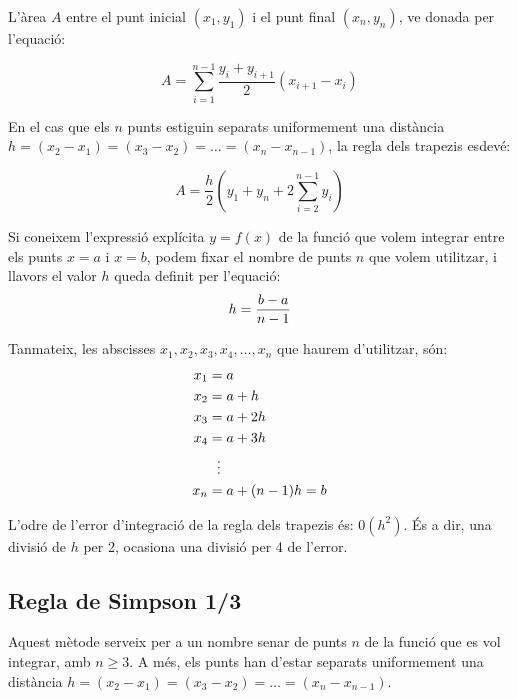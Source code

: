 L'àrea $A$ entre el punt inicial $(x_1, y_1)$ i el punt final $(x_n, y_n)$, ve donada per l'equació:

 \begin{equation}\label{eq:trap-uneven}
    A = \sum_{i=1}^{n-1} \frac{y_i + y_{i+1}}{2} (x_{i+1}-x_i)
 \end{equation}

En el cas que els $n$ punts estiguin separats uniformement una distància $h = (x_2-x_1) = (x_3-x_2) = \dots = (x_n-x_{n-1})$, la regla dels trapezis esdevé:

 \begin{equation}\label{eq:trap}
    A = \frac{h}{2} \left( y_1 + y_n + 2 \sum_{i=2}^{n-1} y_i \right)
 \end{equation}

Si coneixem l'expressió explícita $y=f(x)$ de la funció que volem integrar entre els punts $x=a$ i $x=b$, podem fixar el nombre de punts $n$ que volem utilitzar, i llavors el valor $h$ queda definit per l'equació:
\begin{equation}\label{eq:trap_1}
    h = \frac{b-a}{n-1}\\
\end{equation}

Tanmateix, les abscisses $x_1, x_2, x_3,x_4, \dotsc , x_n$ que haurem d'utilitzar, són:
\begin{align}\label{eq:trap_2}
    x_1 &= a \notag\\
    x_2 &= a + h \notag\\
    x_3 &= a + 2 h \notag\\
    x_4 &= a + 3 h\\
    {} &\hspace{1.5ex}\vdots {} \notag\\
    x_n &= a + (n-1)h =b \notag
\end{align}

L'odre de l'error d'integració de la regla dels trapezis és: $0(h^2)$. És a dir, una divisió de $h$ per 2, ocasiona una divisió per 4 de l'error.

\subsection{Regla de Simpson 1/3}

Aquest mètode serveix per a un nombre senar de punts $n$ de la funció que es vol integrar, amb $n \geq 3$. A més, els punts han d'estar separats uniformement una distància $h = (x_2-x_1) = (x_3-x_2) = \dots = (x_n-x_{n-1})$.

